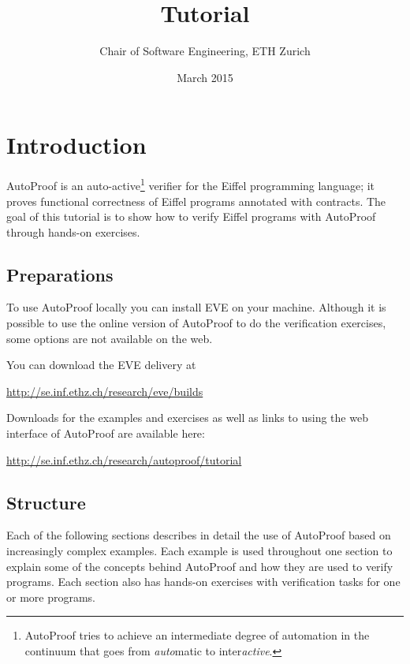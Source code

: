 \documentclass[a4paper,12pt]{article}
\title{\AutoProof Tutorial}
\author{Chair of Software Engineering, ETH Zurich}
\date{March 2015}
\newcommand{\AutoProof}{Auto\-Proof\xspace}
\begin{document}
\maketitle


\section*{Introduction}

\AutoProof is an auto-active\footnote{\AutoProof tries to achieve an intermediate degree of automation in the continuum that goes from \emph{auto}matic to inter\emph{active}.} verifier for the Eiffel programming language; it proves functional correctness of Eiffel programs annotated with contracts. The goal of this tutorial is to show how to verify Eiffel programs with \AutoProof through hands-on exercises.

\subsection*{Preparations}

To use \AutoProof locally you can install EVE on your machine. Although it is possible to use the online version of \AutoProof to do the verification exercises, some options are not available on the web.

You can download the EVE delivery at
\begin{center}
\url{http://se.inf.ethz.ch/research/eve/builds}
\end{center}

Downloads for the examples and exercises as well as links to using the web interface of \AutoProof are available here:
\begin{center}
\url{http://se.inf.ethz.ch/research/autoproof/tutorial}
\end{center}


\subsection*{Structure}

Each of the following sections describes in detail the use of \AutoProof based on increasingly complex examples. Each example is used throughout one section to explain some of the concepts behind \AutoProof and how they are used to verify programs. Each section also has hands-on exercises with verification tasks for one or more programs.
\end{document}
